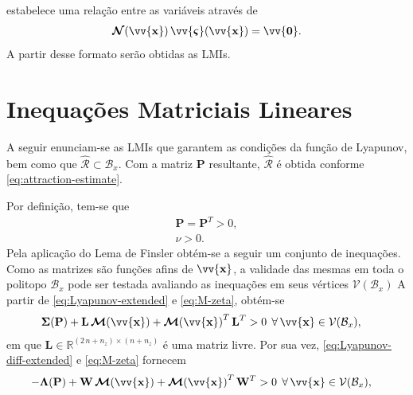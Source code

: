 \documentclass{ppgeesa}
\newcommand*{\Prod}{\,}
\newcommand*{\Bold}[1]{\boldsymbol{\mathbf{#1}}}
\newcommand*{\Matr}[1]{\Bold{#1}}
\newcommand*{\Vect}[1]{\vv{\Bold{#1}}}
\newcommand*{\Transp}[1]{{#1}^{T}}
\newcommand*{\ForAll}{\:\:\forall\,}
\begin{document}
estabelece uma relação entre as variáveis através de
\begin{equation}\label{eq:N-sigma}
  \Matr{\mathcal{N}}(\Vect{x}) \Prod \Vect{\varsigma}(\Vect{x}) = \Vect{0}
  .
\end{equation}
A partir desse formato serão obtidas as LMIs.

\section{Inequações Matriciais Lineares}
A seguir enunciam-se as LMIs que garantem as condições da função de Lyapunov, bem como que $\hat{\mathcal{R}} \subset \mathcal{B}_x$.
Com a matriz $\Matr{P}$ resultante, $\hat{\mathcal{R}}$ é obtida conforme \eqref{eq:attraction-estimate}.

Por definição, tem-se que
\begin{gather}
  \label{eq:constraint-P}
  \Matr{P} = \Transp{\Matr{P}} > 0
  ,
  \\
  \label{eq:constraint-nu}
  \nu > 0
  .
\end{gather}
Pela aplicação do Lema de Finsler \cite{proceedings:Oliveira2001} obtém-se a seguir um conjunto de inequações.
Como as matrizes são funções afins de $\Vect{x}$, a validade das mesmas em toda o politopo $\mathcal{B}_x$ pode ser testada avaliando as inequações em seus vértices $\mathcal{V}(\mathcal{B}_x)$
A partir de \eqref{eq:Lyapunov-extended} e \eqref{eq:M-zeta}, obtém-se
\begin{equation}\label{eq:constraint-sigma}
  \begin{aligned}
    \Matr{\Sigma}(\Matr{P}) + \Matr{L} \Prod \Matr{\mathcal{M}}(\Vect{x}) + \Transp{\Matr{\mathcal{M}}(\Vect{x})} \Prod \Transp{\Matr{L}} &> 0
    \ForAll \Vect{x} \in \mathcal{V}(\mathcal{B}_x)
    ,
  \end{aligned}
\end{equation}
em que $\Matr{L} \in \mathbb{R}^{(2 \Prod n + n_z) \times (n + n_z)}$ é uma matriz livre.
Por sua vez, \eqref{eq:Lyapunov-diff-extended} e \eqref{eq:M-zeta} fornecem
\begin{equation}\label{eq:constraint-lambda}
  \begin{aligned}
    -\Matr{\Lambda}(\Matr{P}) + \Matr{W} \Prod \Matr{\mathcal{M}}(\Vect{x}) + \Transp{\Matr{\mathcal{M}}(\Vect{x})} \Prod \Transp{\Matr{W}} &> 0
    \ForAll \Vect{x} \in \mathcal{V}(\mathcal{B}_x)
    ,
  \end{aligned}
\end{equation}
\end{document}
